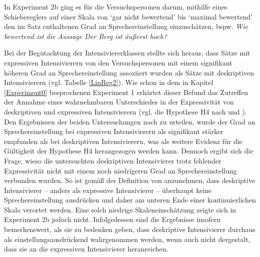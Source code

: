 In Experiment 2b ging es für die Versuchspersonen darum, mithilfe eines Schiebereglers auf einer Skala von `gar nicht bewertend' bis `maximal bewertend' den im Satz enthaltenen Grad an Sprechereinstellung einzuschätzen, bspw. \textit{Wie bewertend ist die Aussage \glqq{}Der Berg ist äußerst hoch\grqq{}?}


Bei der Begutachtung der Intensiviererklassen stellte sich heraus, dass Sätze mit expressiven Intensivierern von den Versuchspersonen mit einem signifikant höheren Grad an Sprechereinstellung assoziiert wurden als Sätze mit deskriptiven Intensivierern (vgl. Tabelle \ref{LinReg2}). Wie schon in dem in Kapitel \ref{Experiment0} besprochenen Experiment 1 erhärtet dieser Befund das Zutreffen der Annahme eines wahrnehmbaren Unterschiedes in der Expressivität von deskriptiven und expressiven Intensivierern (vgl. die Hypothese H4 nach {\citealt[315]{Lang.1983}} und \citealt[57]{Ortner.2014}). Den Ergebnissen der beiden Untersuchungen nach zu urteilen, wurde der Grad an Sprechereinstellung bei expressiven Intensivierern als signifikant stärker empfunden als bei deskriptiven Intensivierern, was als weitere Evidenz für die Gültigkeit der {Hypothese H4} herangezogen werden kann. Dennoch ergibt sich die Frage, wieso die untersuchten deskriptiven Intensivierer trotz fehlender Expressivität nicht mit einem noch niedrigeren Grad an Sprechereinstellung verbunden wurden. So ist gemäß der Definition von \citet[133]{Gutzmann.2019a} anzunehmen, dass deskriptive Intensivierer -- anders als expressive Intensivierer -- überhaupt keine Sprechereinstellung ausdrücken und daher am unteren Ende einer kontinuierlichen Skala verortet werden. Eine solch niedrige Skaleneinschätzung zeigte sich in {Experiment 2b} jedoch nicht. Infolgedessen sind die Ergebnisse insofern bemerkenswert, als sie zu bedenken geben, dass deskriptive Intensivierer durchaus als einstellungsausdrückend wahrgenommen werden, wenn auch nicht dergestalt, dass sie an die expressiven Intensivierer heranreichen.


